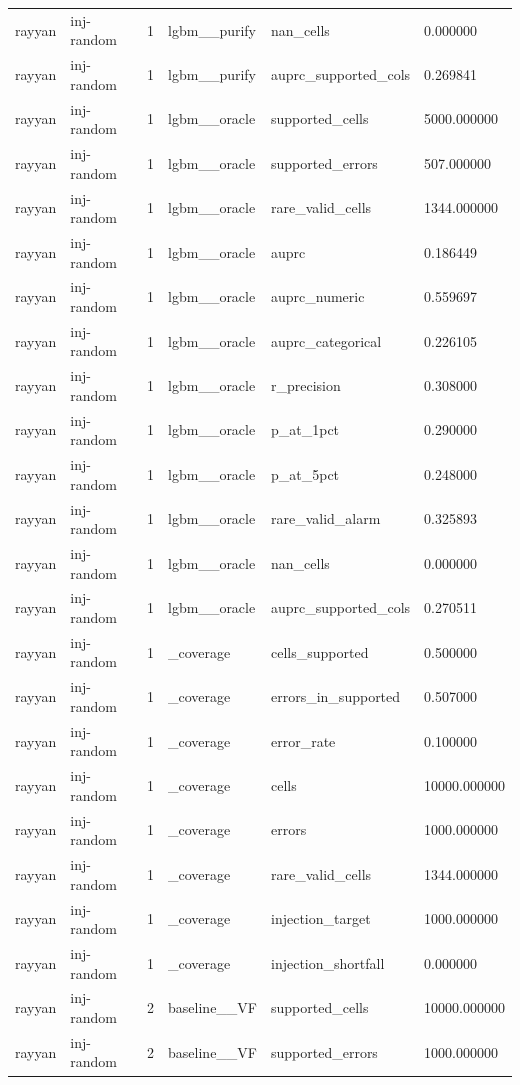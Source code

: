 \begin{tabular}{llllll}
rayyan & inj-random & 1 & lgbm\_\_purify & nan\_cells & 0.000000 \\
rayyan & inj-random & 1 & lgbm\_\_purify & auprc\_supported\_cols & 0.269841 \\
rayyan & inj-random & 1 & lgbm\_\_oracle & supported\_cells & 5000.000000 \\
rayyan & inj-random & 1 & lgbm\_\_oracle & supported\_errors & 507.000000 \\
rayyan & inj-random & 1 & lgbm\_\_oracle & rare\_valid\_cells & 1344.000000 \\
rayyan & inj-random & 1 & lgbm\_\_oracle & auprc & 0.186449 \\
rayyan & inj-random & 1 & lgbm\_\_oracle & auprc\_numeric & 0.559697 \\
rayyan & inj-random & 1 & lgbm\_\_oracle & auprc\_categorical & 0.226105 \\
rayyan & inj-random & 1 & lgbm\_\_oracle & r\_precision & 0.308000 \\
rayyan & inj-random & 1 & lgbm\_\_oracle & p\_at\_1pct & 0.290000 \\
rayyan & inj-random & 1 & lgbm\_\_oracle & p\_at\_5pct & 0.248000 \\
rayyan & inj-random & 1 & lgbm\_\_oracle & rare\_valid\_alarm & 0.325893 \\
rayyan & inj-random & 1 & lgbm\_\_oracle & nan\_cells & 0.000000 \\
rayyan & inj-random & 1 & lgbm\_\_oracle & auprc\_supported\_cols & 0.270511 \\
rayyan & inj-random & 1 & \_coverage & cells\_supported & 0.500000 \\
rayyan & inj-random & 1 & \_coverage & errors\_in\_supported & 0.507000 \\
rayyan & inj-random & 1 & \_coverage & error\_rate & 0.100000 \\
rayyan & inj-random & 1 & \_coverage & cells & 10000.000000 \\
rayyan & inj-random & 1 & \_coverage & errors & 1000.000000 \\
rayyan & inj-random & 1 & \_coverage & rare\_valid\_cells & 1344.000000 \\
rayyan & inj-random & 1 & \_coverage & injection\_target & 1000.000000 \\
rayyan & inj-random & 1 & \_coverage & injection\_shortfall & 0.000000 \\
rayyan & inj-random & 2 & baseline\_\_VF & supported\_cells & 10000.000000 \\
rayyan & inj-random & 2 & baseline\_\_VF & supported\_errors & 1000.000000 \\

\end{tabular}
